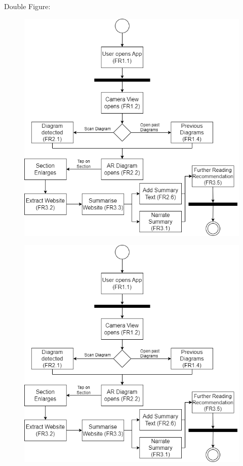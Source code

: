 \documentclass[../main.tex]{subfiles}
\begin{document}
Double Figure:
\begin{figure}[H]
    \centering
    \begin{minipage}{.45\textwidth}
      \centering
      \includegraphics[scale=0.25]{../figures/fig1.png}
      \label{fig2}
    \end{minipage}
    \begin{minipage}{.45\textwidth}
      \centering
      \includegraphics[scale=0.25]{../figures/fig1.png}
      \label{fig3}
    \end{minipage}
\end{figure}
\end{document}
